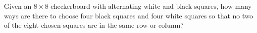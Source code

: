 Given an $8\times 8$ checkerboard with alternating white and black squares, how many ways are there to choose four black squares and four white squares so that no two of the eight chosen squares are in the same row or column?